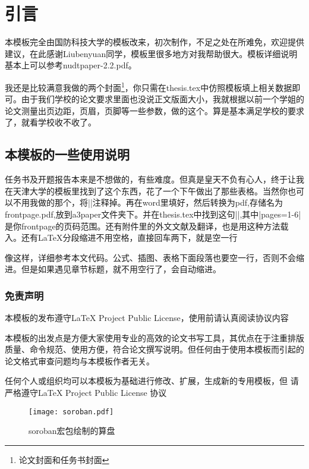 \chapter{引言}

本模板完全由国防科技大学的模板改来，初次制作，不足之处在所难免，欢迎提供建议，在此感谢Liubenyuan同学，模板里很多地方对我帮助很大。模板详细说明基本上可以参考nudtpaper-2.2.pdf。

我还是比较满意我做的两个封面\footnote{论文封面和任务书封面}，你只需在thesis.tex中仿照模板填上相关数据即可。由于我们学校的论文要求里面也没说正文版面大小，我就根据以前一个学姐的论文测量出页边距，页眉，页脚等一些参数，做的这个。算是基本满足学校的要求了，就看学校收不收了。
\section{本模板的一些使用说明}
任务书及开题报告本来是不想做的，有些难度。但真是皇天不负有心人，终于让我在天津大学的模板里找到了这个东西，花了一个下午做出了那些表格。当然你也可以不用我做的那个，将\latexinline||注释掉。再在word里填好，然后转换为pdf,存储名为frontpage.pdf,放到a3paper文件夹下。并在thesis.tex中找到这句||,其中\latexinline|pages={1-6}|是你frontpage的页码范围。还有附件里的外文文献及翻译，也是用这种方法载入。还有\LaTeX{}分段缩进不用空格，直接回车两下，就是空一行

像这样，详细参考本文代码。公式、插图、表格下面段落也要空一行，否则不会缩进。但是如果遇见章节标题，就不用空行了，会自动缩进。
\subsection{免责声明}
\begin{myList}
\item 本模板的发布遵守\LaTeX{} Project Public License，使用前请认真阅读协议内容
\item 本模板的出发点是方便大家使用专业的高效的论文书写工具，其优点在于注重排版质量、命令规范、使用方便，符合论文撰写说明。但任何由于使用本模板而引起的论文格式审查问题均与本模板作者无关。
\item 任何个人或组织均可以本模板为基础进行修改、扩展，生成新的专用模板，但
请严格遵守\LaTeX{} Project Public License 协议
\end{myList}
\begin{figure}[htp]
\centering
\texttt{[image: soroban.pdf]}
\caption{soroban宏包绘制的算盘}
\end{figure}


